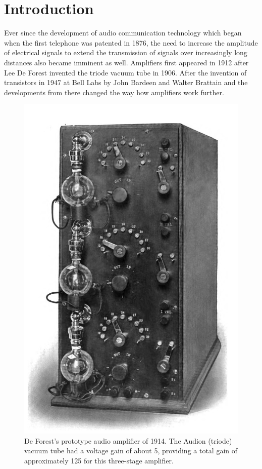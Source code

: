 \documentclass[%
 reprint,
nofootinbib,
 amsmath,amssymb,
 aps,
]{revtex4-2}
\begin{document}
\section{\label{sec:level1}Introduction}
    Ever since the development of audio communication technology which began when the first telephone was patented in 1876, the need to increase the amplitude of electrical signals to extend the transmission of signals over increasingly long distances also became imminent as well. Amplifiers first appeared in 1912 after Lee De Forest invented the triode vacuum tube in 1906. After the invention of transistors in 1947 at Bell Labs by John Bardeen and Walter Brattain and the developments from there changed the way how amplifiers work further.
    \begin{figure}
        \centering
        \includegraphics[scale = 0.1]{Figures/First_Audion_amplifier_1914.jpg}
        \caption{De Forest's prototype audio amplifier of 1914. The Audion (triode) vacuum tube had a voltage gain of about 5, providing a total gain of approximately 125 for this three-stage amplifier.}
        \label{fig:prism}
    \end{figure}
\end{document}
